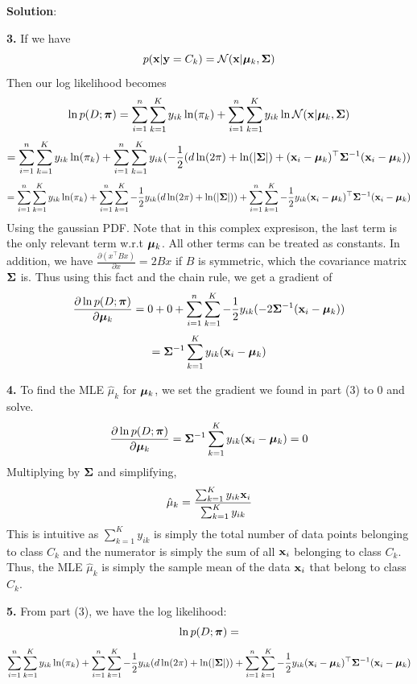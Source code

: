 \documentclass[submit]{../harvardml}
\newenvironment{solution}{
    \vspace{2mm}
    \color{black}\noindent\textbf{Solution}:
}{}
\begin{document}
\begin{solution}
\begin{tcolorbox}
    \end{tcolorbox}
    \begin{tcolorbox}
        \textbf{3.} If we have 
        $$p(\mathbf{x} | \mathbf{y} = C_k) = \mathcal{N}(\mathbf{x} |  \boldsymbol{\mu}_k, \mathbf{\Sigma})$$
        Then our log likelihood becomes
        $$\ln p(D; \boldsymbol{\pi}) = \sum_{i=1}^n \sum_{k=1}^K  y_{ik}\ln(\pi_k) + \sum_{i=1}^n \sum_{k=1}^K  y_{ik}\ln \mathcal{N}(\mathbf{x} |  \boldsymbol{\mu}_k, \mathbf{\Sigma})$$
        $$ =\sum_{i=1}^n \sum_{k=1}^K  y_{ik}\ln(\pi_k) + \sum_{i=1}^n \sum_{k=1}^K  y_{ik} (-\frac{1}{2}(d\ln(2\pi) + \ln(|\mathbf{\Sigma}|) + (\mathbf{x}_i - \boldsymbol{\mu}_k)^\top \mathbf{\Sigma}^{-1}(\mathbf{x}_i - \boldsymbol{\mu}_k))$$
        $$ = \sum_{i=1}^n \sum_{k=1}^K  y_{ik}\ln(\pi_k) + \sum_{i=1}^n \sum_{k=1}^K -\frac{1}{2} y_{ik} (d\ln(2\pi) + \ln(|\mathbf{\Sigma}|)) + \sum_{i=1}^n \sum_{k=1}^K  -\frac{1}{2} y_{ik}(\mathbf{x}_i - \boldsymbol{\mu}_k)^\top \mathbf{\Sigma}^{-1}(\mathbf{x}_i - \boldsymbol{\mu}_k)$$
        Using the gaussian PDF. Note that in this complex expresison, the last term is the only relevant term w.r.t $\boldsymbol{\mu}_k$. All other terms can be treated as constants. In addition, we have $\frac{\partial (x^\top B x)}{\partial x} = 2Bx$ if $B$ is symmetric, which the covariance matrix $\mathbf{\Sigma}$ is. Thus using this fact and the chain rule, we get a gradient of
        $$\frac{\partial \ln p(D; \boldsymbol{\pi})}{\partial \boldsymbol{\mu}_k} = 0 + 0 +\sum_{i=1}^n \sum_{k=1}^K -\frac{1}{2}y_{ik}(-2 \mathbf{\Sigma}^{-1}(\mathbf{x}_i - \boldsymbol{\mu}_k))$$
        $$ = \mathbf{\Sigma}^{-1} \sum_{k=1}^K y_{ik}(\mathbf{x}_i - \boldsymbol{\mu}_k)$$
    \end{tcolorbox}
    \begin{tcolorbox}
        \textbf{4.} To find the MLE $\hat\mu_k$ for $\boldsymbol{\mu}_k$, we set the gradient we found in part (3) to 0 and solve.
        $$\frac{\partial \ln p(D; \boldsymbol{\pi})}{\partial \boldsymbol{\mu}_k} = \mathbf{\Sigma}^{-1} \sum_{k=1}^K y_{ik}(\mathbf{x}_i - \boldsymbol{\mu}_k) = 0$$
        Multiplying by $\mathbf{\Sigma}$ and simplifying,
        $$\hat\mu_k = \frac{\sum_{k=1}^K y_{ik}\mathbf{x}_i}{\sum_{k=1}^K y_{ik}}$$
        This is intuitive as $\sum_{k=1}^K y_{ik}$ is simply the total number of data points belonging to class $C_k$ and the numerator is simply the sum of all $\mathbf{x}_i$ belonging to class $C_k$. Thus, the MLE $\hat\mu_k$ is simply the sample mean of the data $\mathbf{x}_i$ that belong to class $C_k$.
    \end{tcolorbox} 
    \begin{tcolorbox}
        \textbf{5.} From part (3), we have the log likelihood:
        $$\ln p(D; \boldsymbol{\pi}) = $$
        $$\sum_{i=1}^n \sum_{k=1}^K  y_{ik}\ln(\pi_k) + \sum_{i=1}^n \sum_{k=1}^K -\frac{1}{2} y_{ik} (d\ln(2\pi) + \ln(|\mathbf{\Sigma}|)) + \sum_{i=1}^n \sum_{k=1}^K  -\frac{1}{2} y_{ik}(\mathbf{x}_i - \boldsymbol{\mu}_k)^\top \mathbf{\Sigma}^{-1}(\mathbf{x}_i - \boldsymbol{\mu}_k)$$

\end{tcolorbox}
\end{solution}
\end{document}
